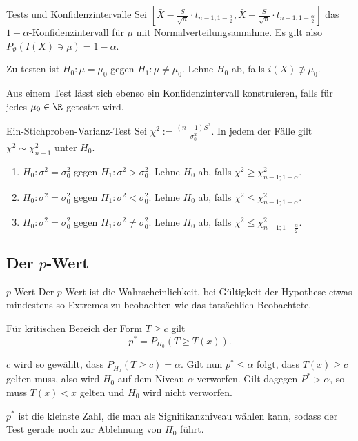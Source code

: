 \begin{karte}{Tests und Konfidenzintervalle}
Sei \( [\bar{X} - \frac{S}{\sqrt{n}} \cdot t_{n-1;1-\frac{\alpha}{2}}, \bar{X} + \frac{S}{\sqrt{n}} \cdot t_{n-1;1-\frac{\alpha}{2}}] \)
das \(1-\alpha\)-Konfidenzintervall für \(\mu\) mit Normalverteilungsannahme. 
Es gilt also \(P_\vartheta(I(X) \ni \mu) = 1-\alpha\). 

Zu testen ist 
\(H_0: \mu=\mu_0\) gegen \(H_1: \mu \neq \mu_0\).
Lehne \(H_0\) ab, falls \(i(X) \not\ni \mu_0\).

Aus einem Test lässt sich ebenso ein Konfidenzintervall konstruieren, falls für jedes \(\mu_0 \in \R\) getestet wird.
\end{karte}

\begin{karte}{Ein-Stichproben-Varianz-Test}
Sei \(\chi^2 := \frac{(n-1)S^2}{\sigma_0^2}\). 
In jedem der Fälle gilt \(\chi^2 \sim \chi_{n-1}^2 \) unter \(H_0\).
\begin{enumerate}
    \item \(H_0: \sigma^2 = \sigma_0^2\) gegen \(H_1: \sigma^2 > \sigma_0^2\). Lehne \(H_0\) ab, falls \(\chi^2 \geq \chi_{n-1;1-\alpha}^2\).
    \item \(H_0: \sigma^2 = \sigma_0^2\) gegen \(H_1: \sigma^2 < \sigma_0^2\). Lehne \(H_0\) ab, falls \(\chi^2 \leq \chi_{n-1;1-\alpha}^2\).
    \item \(H_0: \sigma^2 = \sigma_0^2\) gegen \(H_1: \sigma^2 \neq \sigma_0^2\). Lehne \(H_0\) ab, falls \(\chi^2 \leq \chi_{n-1;1-\frac{\alpha}{2}}^2\).
\end{enumerate}
\end{karte}

\subsection{Der \(p\)-Wert}

\begin{karte}{\(p\)-Wert}
Der \(p\)-Wert ist die Wahrscheinlichkeit, bei Gültigkeit der Hypothese etwas mindestens so Extremes zu beobachten wie das tatsächlich Beobachtete.

Für kritischen Bereich der Form \(T \geq c\) gilt 
\[ p^* = P_{H_0}(T \geq T(x)). \]

\(c\) wird so gewählt, dass \(P_{H_0}(T\geq c) = \alpha\).
Gilt nun \(p^* \leq \alpha\) folgt, dass \(T(x) \geq c \) gelten muss, also wird \(H_0\) auf dem Niveau \(\alpha\) verworfen. 
Gilt dagegen \(P^* > \alpha\), so muss \(T(x) < x\) gelten und \(H_0\) wird nicht verworfen.

\(p^*\) ist die kleinste Zahl, die man als Signifikanzniveau wählen kann, sodass der Test gerade noch zur Ablehnung von \(H_0\) führt.
\end{karte}

